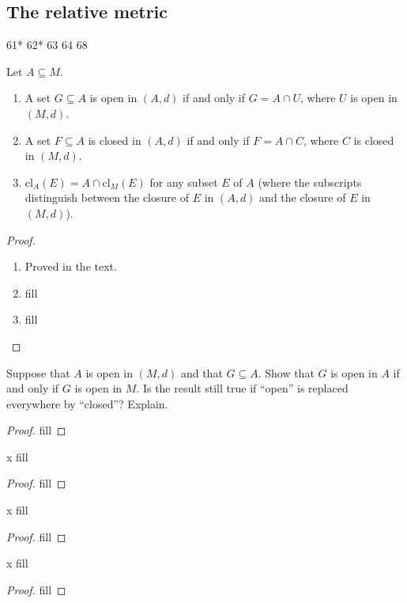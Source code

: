\subsection{The relative metric}

61*
62*
63
64
68

\begin{exercise}{61}
Let $A\subseteq M$.
\begin{enumerate}
    \item A set $G\subseteq A$ is open in $(A,d)$ if and only if $G=A\cap U$, where $U$ is open in $(M,d)$.
    \item A set $F\subseteq A$ is closed in $(A,d)$ if and only if $F=A\cap C$, where $C$ is closed in $(M,d)$.
    \item $\text{cl}_A(E)=A\cap\text{cl}_M(E)$ for any subset $E$ of $A$ (where the subscripts distinguish between the closure of $E$ in $(A,d)$ and the closure of $E$ in $(M,d)$).
\end{enumerate}
\end{exercise}
\begin{proof}
\begin{enumerate}
    \item Proved in the text.
    \item fill
    \item fill
\end{enumerate}
\end{proof} 

\begin{exercise}{62}
Suppose that $A$ is open in $(M,d)$ and that $G\subseteq A$. Show that $G$ is open in $A$ if and only if $G$ is open in $M$. Is the result still true if ``open'' is replaced everywhere by ``closed''? Explain.
\end{exercise}
\begin{proof}
fill
\end{proof} 

\begin{exercise}{x}
fill
\end{exercise}
\begin{proof}
fill
\end{proof} 

\begin{exercise}{x}
fill
\end{exercise}
\begin{proof}
fill
\end{proof} 

\begin{exercise}{x}
fill
\end{exercise}
\begin{proof}
fill
\end{proof} 
